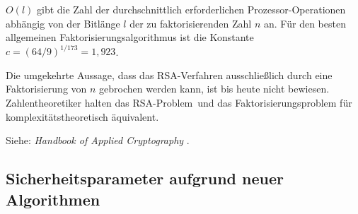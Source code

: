 \begin{refsegment}
$O(l)$ gibt die Zahl der durchschnittlich erforderlichen Prozessor-Operationen abhängig von der Bitlänge $l$ der zu
faktorisierenden Zahl $n$ an. Für den besten allgemeinen Faktorisierungsalgorithmus ist die Konstante
$c = (64/9)^{1/173} = 1,923$.

Die umgekehrte Aussage, dass das RSA-Verfahren ausschließlich durch eine Faktorisierung von $n$ gebrochen werden kann,
ist bis heute nicht bewiesen. Zahlentheoretiker halten das \glqq RSA-Problem\grqq~und das Faktorisierungsproblem für
komplexitätstheoretisch äquivalent.

Siehe: {\em Handbook of Applied Cryptography} \cite{Menezes2001}.



\subsection{Sicherheitsparameter aufgrund neuer Algorithmen}
\label{chptSecurityParam}

\end{refsegment}
